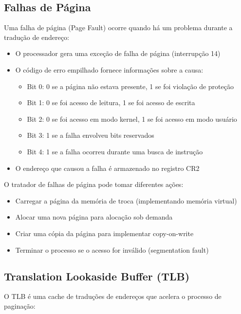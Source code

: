 \subsection{Falhas de Página}
\label{subsec:falhas_pagina}

Uma falha de página (Page Fault) ocorre quando há um problema durante a tradução de endereço:

\begin{itemize}
    \item O processador gera uma exceção de falha de página (interrupção 14)
    \item O código de erro empilhado fornece informações sobre a causa:
        \begin{itemize}
            \item Bit 0: 0 se a página não estava presente, 1 se foi violação de proteção
            \item Bit 1: 0 se foi acesso de leitura, 1 se foi acesso de escrita
            \item Bit 2: 0 se foi acesso em modo kernel, 1 se foi acesso em modo usuário
            \item Bit 3: 1 se a falha envolveu bits reservados
            \item Bit 4: 1 se a falha ocorreu durante uma busca de instrução
        \end{itemize}
    \item O endereço que causou a falha é armazenado no registro CR2
\end{itemize}

O tratador de falhas de página pode tomar diferentes ações:
\begin{itemize}
    \item Carregar a página da memória de troca (implementando memória virtual)
    \item Alocar uma nova página para alocação sob demanda
    \item Criar uma cópia da página para implementar copy-on-write
    \item Terminar o processo se o acesso for inválido (segmentation fault)
\end{itemize}

\subsection{Translation Lookaside Buffer (TLB)}
\label{subsec:tlb}

O TLB é uma cache de traduções de endereços que acelera o processo de paginação:

